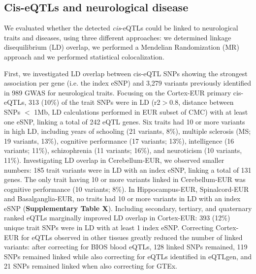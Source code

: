 \subsection{Cis-eQTLs and neurological disease}

We evaluated whether the detected \emph{cis}-eQTLs could be linked to neurological traits and diseases, using three different approaches: we determined linkage disequilibrium (LD) overlap, we performed a Mendelian Randomization (MR) approach and we performed statistical colocalization. 

First, we investigated LD overlap between cis-eQTL SNPs showing the strongest association per gene (i.e. the index eSNP) and 3,279 variants previously identified in 989 GWAS for neurological traits. Focusing on the Cortex-EUR primary cis-eQTLs, 313 (10\%) of the trait SNPs were in LD (r2$>$0.8, distance between SNPs $<$ 1Mb, LD calculations performed in EUR subset of CMC) with at least one eSNP, linking a total of 242 eQTL genes. Six traits had 10 or more variants in high LD, including years of schooling (21 variants, 8\%), multiple sclerosis (MS; 19 variants, 13\%), cognitive performance (17 variants; 13\%), intelligence (16 variants; 11\%), schizophrenia (11 variants; 16\%), and neuroticism (10 variants, 11\%). Investigating LD overlap in Cerebellum-EUR, we observed smaller numbers: 185 trait variants were in LD with an index eSNP, linking a total of 131 genes. The only trait having 10 or more variants linked in Cerebellum-EUR was cognitive performance (10 variants; 8\%). In Hippocampus-EUR, Spinalcord-EUR and Basalganglia-EUR, no traits had 10 or more variants in LD with an index eSNP (\textbf{Supplementary Table X}). Including secondary, tertiary, and quaternary ranked eQTLs marginally improved LD overlap in Cortex-EUR: 393 (12\%) unique trait SNPs were in LD with at least 1 index eSNP. Correcting Cortex-EUR for eQTLs observed in other tissues greatly reduced the number of linked variants: after correcting for BIOS blood eQTLs, 128 linked SNPs remained, 119 SNPs remained linked while also correcting for eQTLs identified in eQTLgen, and 21 SNPs remained linked when also correcting for GTEx.

